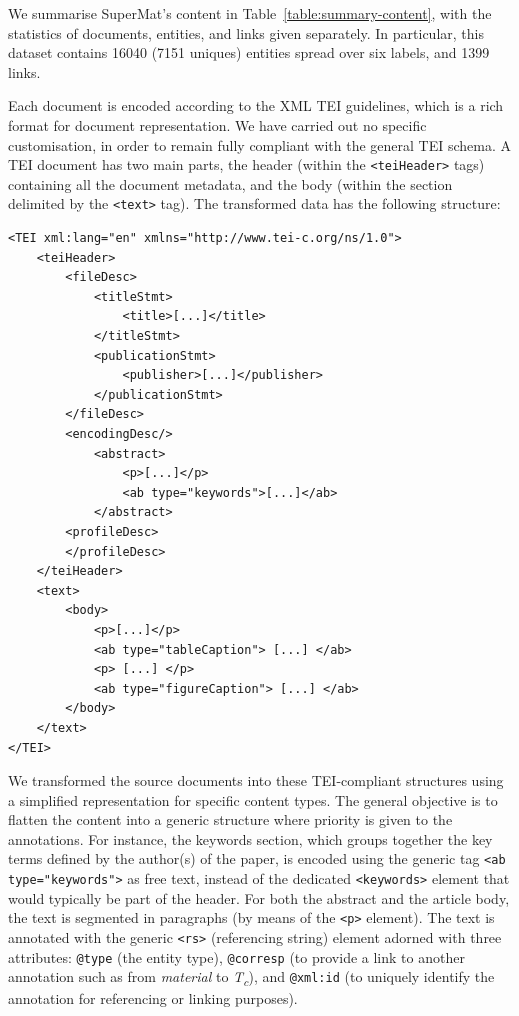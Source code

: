 \documentclass[fleqn,10pt]{wlscirep}
\begin{document}
We summarise SuperMat's content in Table~\ref{table:summary-content}, with the statistics of documents, entities, and links given separately. In particular, this dataset contains 16040 (7151 uniques) entities spread over six labels, and 1399 links. 
    
Each document is encoded according to the XML TEI guidelines, which is a rich format for document representation. 
We have carried out no specific customisation, in order to remain fully compliant with the general TEI schema.
A TEI document has two main parts, the header (within the \texttt{<teiHeader>} tags) containing all the document metadata, and the body (within the section delimited by the \texttt{<text>} tag). 
The transformed data has the following structure: 

\begin{verbatim}
<TEI xml:lang="en" xmlns="http://www.tei-c.org/ns/1.0">
    <teiHeader>
        <fileDesc>
            <titleStmt>
                <title>[...]</title>
            </titleStmt>
            <publicationStmt>
                <publisher>[...]</publisher>
            </publicationStmt>
        </fileDesc>
        <encodingDesc/>
            <abstract>
                <p>[...]</p>
                <ab type="keywords">[...]</ab>
            </abstract>
        <profileDesc>
        </profileDesc>
    </teiHeader>
    <text>
        <body>
            <p>[...]</p>
            <ab type="tableCaption"> [...] </ab>
            <p> [...] </p>
            <ab type="figureCaption"> [...] </ab> 
        </body>
    </text>
</TEI>
\end{verbatim}

We transformed the source documents into these TEI-compliant structures using a simplified representation for specific content types.
The general objective is to flatten the content into a generic structure where priority is given to the annotations.
For instance, the keywords section, which groups together the key terms defined by the author(s) of the paper, is encoded using the generic tag \texttt{<ab type="keywords">} as free text, instead of the dedicated \texttt{<keywords>} element that would typically be part of the header. 
For both the abstract and the article body, the text is segmented in paragraphs (by means of the \texttt{<p>} element). 
The text is annotated with the generic \texttt{<rs>} (referencing string) element adorned with three attributes: \texttt{@type} (the entity type), \texttt{@corresp} (to provide a link to another annotation such as from \textit{material} to \textit{T\textsubscript{c}}), and \texttt{@xml:id} (to uniquely identify the annotation for referencing or linking purposes).
\end{document}
